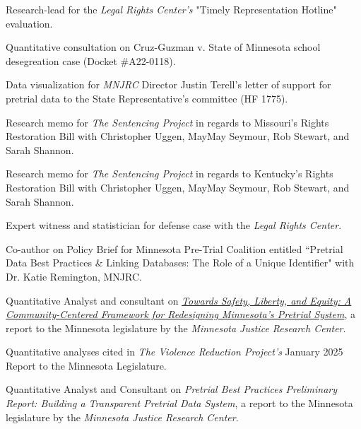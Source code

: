 \documentclass[letterpaper]{article}
\newenvironment{publist}{%
  \begin{list}{}{%
    \setlength{\leftmargin}{0cm}   %
    \setlength{\labelwidth}{2cm}     %
    \setlength{\labelsep}{0.5cm}     %
  }%
}{%
  \end{list}%
}
\begin{document}
\begin{publist}

\item[\textbf{2026}] Research-lead for the \textit{Legal Rights Center's} "Timely Representation Hotline" evaluation.  

\item Quantitative consultation on Cruz-Guzman v. State of Minnesota school desegreation case (Docket \#A22-0118). 

\item Data visualization for \textit{MNJRC} Director Justin Terell's letter of support for pretrial data to the State Representative's committee (HF 1775). 

\item Research memo for \textit{The Sentencing Project} in regards to Missouri's Rights Restoration Bill with Christopher Uggen, MayMay Seymour, Rob Stewart, and Sarah Shannon. 

\item Research memo for \textit{The Sentencing Project} in regards to Kentucky's Rights Restoration Bill with Christopher Uggen, MayMay Seymour, Rob Stewart, and Sarah Shannon. 

\item[\textbf{2025}] Expert witness and statistician for defense case with the \textit{Legal Rights Center}.

\item Co-author on Policy Brief for Minnesota Pre-Trial Coalition entitled ``Pretrial Data Best Practices \& Linking Databases: The Role of a Unique Identifier" with Dr. Katie Remington, MNJRC.

\item Quantitative Analyst and consultant on \href{https://e038407e-8024-4a7f-8f8c-ce70d24cbc8c.usrfiles.com/ugd/c9192e_1a8af5bd8528461abd63b9b3f3f62e0f.pdf}{\textit{Towards Safety, Liberty, and Equity: A Community-Centered Framework for Redesigning Minnesota's Pretrial System}}, a report to the Minnesota legislature by the \textit{Minnesota Justice Research Center}. 
 
\item[\textbf{2024}] Quantitative analyses cited in \textit{The Violence Reduction Project's} January 2025 Report to the Minnesota Legislature.  

\item Quantitative Analyst and Consultant on \textit{Pretrial Best Practices Preliminary Report: Building a Transparent Pretrial Data System}, a report to the Minnesota legislature by the \textit{Minnesota Justice Research Center}.


\end{publist}
\end{document}
